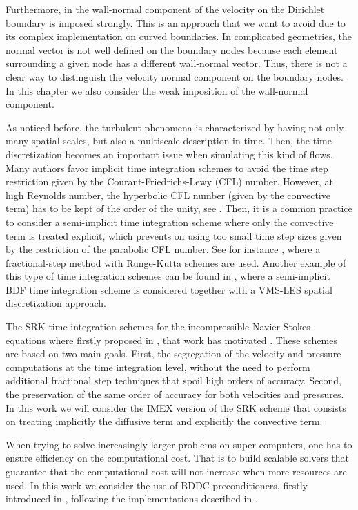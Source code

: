 Furthermore, in \cite{bazilevs_weak_2007-1,bazilevs_weak_2007} the wall-normal component of the velocity on the Dirichlet boundary is imposed strongly. This is an approach that we want to avoid due to its complex implementation on curved boundaries. In complicated geometries, the normal vector is not well defined on the boundary nodes because each element surrounding a given node has a different wall-normal vector. Thus, there is not a clear way to distinguish the velocity normal component on the boundary nodes. In this chapter we also consider the weak imposition of the wall-normal component.

As noticed before, the turbulent phenomena is characterized by having not only many spatial scales, but also a multiscale description in time. Then, the time discretization becomes an important issue when simulating this kind of flows. Many authors favor implicit time integration schemes to avoid the time step restriction given by the Courant-Friedrichs-Lewy (CFL) number. However, at high Reynolds number, the hyperbolic CFL number (given by the convective term) has to be kept of the order of the unity, see \cite{choi_effects_1994}. Then, it is a common practice to consider a semi-implicit time integration scheme where only the convective term is treated explicit, which prevents on using too small time step sizes given by the restriction of the parabolic CFL number. See for instance \cite{le_improvement_1991}, where a fractional-step method with Runge-Kutta schemes are used. Another example of this type of time integration schemes can be found in \cite{forti_semi-implicit_2015}, where a semi-implicit BDF time integration scheme is considered together with a VMS-LES spatial discretization approach.

The SRK time integration schemes for the incompressible Navier-Stokes equations where firstly proposed in \cite{colomes_segregated_2015}, that work has motivated . These schemes are based on two main goals. First, the segregation of the velocity and pressure computations at the time integration level, without the need to perform additional fractional step techniques that spoil high orders of accuracy. Second, the preservation of the same order of accuracy for both velocities and pressures. In this work we will consider the IMEX version of the SRK scheme that consists on treating implicitly the diffusive term and explicitly the convective term.

When trying to solve increasingly larger problems on super-computers, one has to ensure efficiency on the computational cost. That is to build scalable solvers that guarantee that the computational cost will not increase when more resources are used. In this work we consider the use of BDDC preconditioners, firstly introduced in \cite{dohrmann_preconditioner_2003}, following the implementations described in \cite{badia_highly_2014,alberto_f._martin_santiago_badia_and_javier_principe_multilevel_????}.

